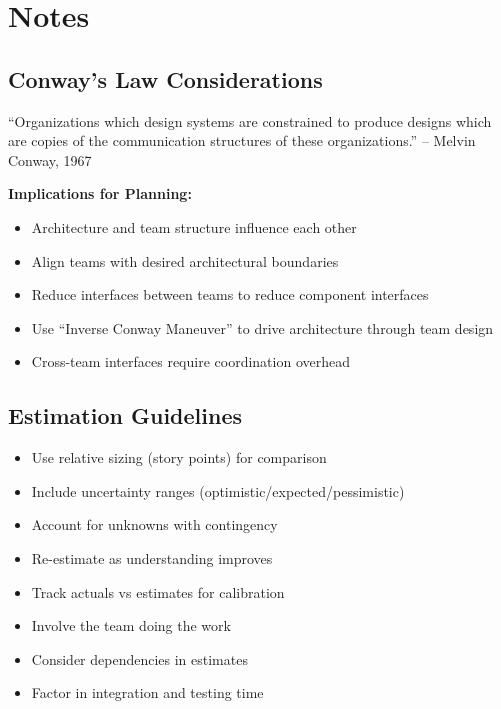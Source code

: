 \documentclass[11pt,letterpaper]{article}
\begin{document}
\section{Notes}

\subsection{Conway's Law Considerations}

\begin{planningbox}
``Organizations which design systems are constrained to produce designs which are copies of the communication structures of these organizations.'' -- Melvin Conway, 1967

\textbf{Implications for Planning:}
\begin{itemize}[nosep]
    \item Architecture and team structure influence each other
    \item Align teams with desired architectural boundaries
    \item Reduce interfaces between teams to reduce component interfaces
    \item Use ``Inverse Conway Maneuver'' to drive architecture through team design
    \item Cross-team interfaces require coordination overhead
\end{itemize}
\end{planningbox}

\subsection{Estimation Guidelines}

\begin{teambox}
\begin{itemize}[nosep]
    \item Use relative sizing (story points) for comparison
    \item Include uncertainty ranges (optimistic/expected/pessimistic)
    \item Account for unknowns with contingency
    \item Re-estimate as understanding improves
    \item Track actuals vs estimates for calibration
    \item Involve the team doing the work
    \item Consider dependencies in estimates
    \item Factor in integration and testing time
\end{itemize}
\end{teambox}
\end{document}
